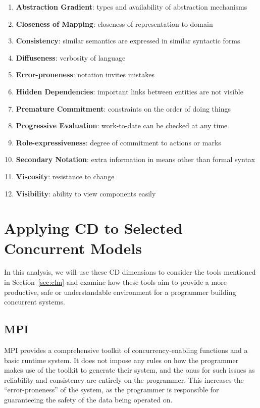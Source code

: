 \documentclass{sig-alternate}
\begin{document}
\begin{enumerate}
\item \textbf{Abstraction Gradient}: types and availability of abstraction mechanisms
\item \textbf{Closeness of Mapping}: closeness of representation to domain
\item \textbf{Consistency}: similar semantics are expressed in similar syntactic forms
\item \textbf{Diffuseness}: verbosity of language
\item \textbf{Error-proneness}: notation invites mistakes
\item \textbf{Hidden Dependencies}: important links between entities are not visible
\item \textbf{Premature Commitment}: constraints on the order of doing things
\item \textbf{Progressive Evaluation}: work-to-date can be checked at any time
\item \textbf{Role-expressiveness}: degree of commitment to actions or marks
\item \textbf{Secondary Notation}: extra information in means other than formal syntax
\item \textbf{Viscosity}: resistance to change
\item \textbf{Visibility}: ability to view components easily
\end{enumerate}

\section{Applying CD to Selected Concurrent Models}
In this analysis, we will use these CD dimensions to consider the
tools mentioned in Section~\ref{sec:clm} and examine how these tools
aim to provide a more productive, safe or understandable environment
for a programmer building concurrent systems.

\subsection{MPI}
MPI provides a comprehensive toolkit of concurrency-enabling functions
and a basic runtime system. It does not impose any rules on how the
programmer makes use of the toolkit to generate their system, and the
onus for such issues as reliability and consistency are entirely on
the programmer. This increases the ``error-proneness'' of the system,
as the programmer is responsible for guaranteeing the safety of the
data being operated on.
\end{document}
